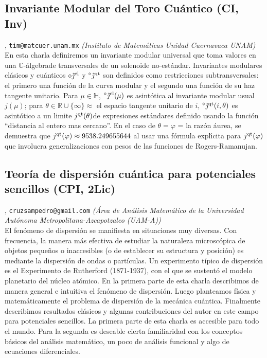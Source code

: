 \subsection{\sffamily Invariante Modular del Toro Cu\'antico {\footnotesize (CI, Inv)}} \label{reg-1530} 
, {\tt tim@matcuer.unam.mx}  {\slshape (Instituto de Matem\'aticas Unidad Cuernavaca UNAM)}\\
          \noindent En esta charla definiremos un invariante modular universal que toma valores en una $\mathbb{C}$-\'{a}lgebrade transversales de un solenoide no-est\'andar.  Invariantes modulares cl\'{a}sicos y cu\'{a}nticos  $\diamond \hat{\jmath}^{\rm cl}$ y ${}^{\diamond} \hat{\jmath}^{\rm qt}$ son definidos como restricciones subtransversales: el primero una funci\'{o}n de la curva modular y el segundo una funci\'{o}n de su haz tangente unitario.  Para $\mu\in\mathbb{H}$, ${}^{\diamond}\hat{\jmath}^{\rm cl}(\mu)$ es asint\'{o}tica al invariante modular usual $j(\mu )$; para $\theta\in\mathbb{R}\cup\{\infty\}\approx$ el espacio tangente unitario de $i$, ${}^{\diamond}\hat{\jmath}^{\rm qt}(i,\theta )$ es asint\'{o}tico a un limite $j^{\rm qt}(\theta )$de expresiones est\'andares definido usando la funci\'{o}n ``distancia al entero mas cercano''. En el caso de $\theta=\varphi$ = la raz\'on \'{a}urea, se demuestra que $j^{\rm qt}(\varphi )\approx 9538.249655644 $ al usar una f\'{o}rmula expl\'{\i}cita para $j^{\rm qt}(\varphi )$ que involucra generalizaciones con pesos de las funciones de Rogers-Ramanujan.
\subsection{\sffamily Teor\'ia de dispersi\'on cu\'antica  para potenciales sencillos {\footnotesize (CPI, 2Lic)}} \label{reg-729} 
, {\tt cruzsampedro@gmail.com}  {\slshape (\'Area de An\'alisis Matem\'atico de la Universidad Aut\'onoma Metropolita\-na-Azcapotzalco (UAM-A))}\\
          \noindent El  fen\'omeno de  dispersi\'on se manifiesta en situaciones muy diversas. Con frecuencia, la manera m\'as efectiva  de estudiar la naturaleza microsc\'opica de objetos peque\~nos o inaccesibles (o de establecer su estructura y posici\'on) es mediante  la dispersi\'on de ondas o part\'iculas. Un experimento t\'ipico de dispersi\'on es el Experimento de Rutherford (1871-1937),   con el que se  sustent\'o el modelo planetario del n\'ucleo at\'omico. En la primera parte de esta charla describimos de manera  general e intuitiva el fen\'omeno de dispersi\'on. Luego   planteamos f\'isica y matem\'aticamente  el problema de dispersi\'on de la mec\'anica cu\'antica.  Finalmente describimos  resultados cl\'asicos y algunas contribuciones del autor en este campo para potenciales sencillos. La primera parte de esta charla es accesible para todo el mundo. Para la segunda es deseable cierta familiaridad con  los conceptos b\'asicos del an\'alisis matem\'atico, un poco de an\'alisis funcional y algo de ecuaciones diferenciales.
